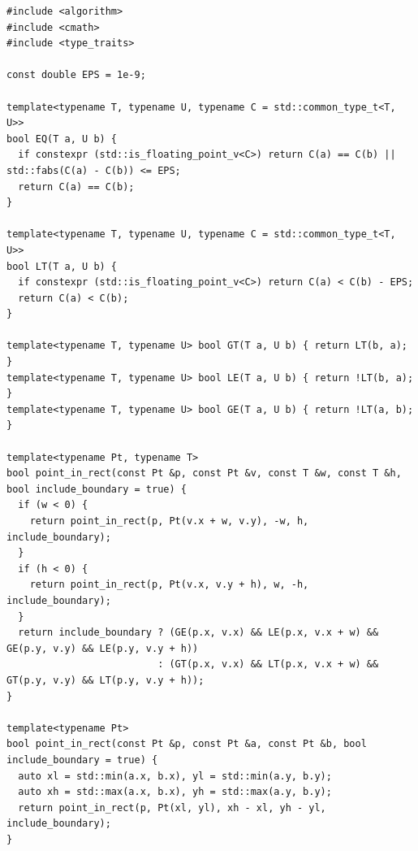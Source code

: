 \begin{lstlisting}[style=cpp]
#include <algorithm>
#include <cmath>
#include <type_traits>

const double EPS = 1e-9;

template<typename T, typename U, typename C = std::common_type_t<T, U>>
bool EQ(T a, U b) {
  if constexpr (std::is_floating_point_v<C>) return C(a) == C(b) || std::fabs(C(a) - C(b)) <= EPS;
  return C(a) == C(b);
}

template<typename T, typename U, typename C = std::common_type_t<T, U>>
bool LT(T a, U b) {
  if constexpr (std::is_floating_point_v<C>) return C(a) < C(b) - EPS;
  return C(a) < C(b);
}

template<typename T, typename U> bool GT(T a, U b) { return LT(b, a); }
template<typename T, typename U> bool LE(T a, U b) { return !LT(b, a); }
template<typename T, typename U> bool GE(T a, U b) { return !LT(a, b); }

template<typename Pt, typename T>
bool point_in_rect(const Pt &p, const Pt &v, const T &w, const T &h, bool include_boundary = true) {
  if (w < 0) {
    return point_in_rect(p, Pt(v.x + w, v.y), -w, h, include_boundary);
  }
  if (h < 0) {
    return point_in_rect(p, Pt(v.x, v.y + h), w, -h, include_boundary);
  }
  return include_boundary ? (GE(p.x, v.x) && LE(p.x, v.x + w) && GE(p.y, v.y) && LE(p.y, v.y + h))
                          : (GT(p.x, v.x) && LT(p.x, v.x + w) && GT(p.y, v.y) && LT(p.y, v.y + h));
}

template<typename Pt>
bool point_in_rect(const Pt &p, const Pt &a, const Pt &b, bool include_boundary = true) {
  auto xl = std::min(a.x, b.x), yl = std::min(a.y, b.y);
  auto xh = std::max(a.x, b.x), yh = std::max(a.y, b.y);
  return point_in_rect(p, Pt(xl, yl), xh - xl, yh - yl, include_boundary);
}


\end{lstlisting}
